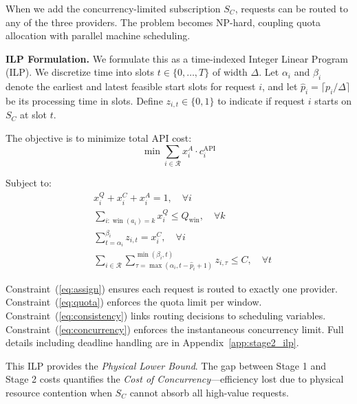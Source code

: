 When we add the concurrency-limited subscription $S_C$, requests can be routed to any of the three providers. The problem becomes NP-hard, coupling quota allocation with parallel machine scheduling.

\textbf{ILP Formulation.}
We formulate this as a time-indexed Integer Linear Program (ILP). We discretize time into slots $t \in \{0, \dots, T\}$ of width $\Delta$. Let $\alpha_i$ and $\beta_i$ denote the earliest and latest feasible start slots for request $i$, and let $\hat{p}_i = \lceil p_i / \Delta \rceil$ be its processing time in slots. Define $z_{i,t} \in \{0,1\}$ to indicate if request $i$ starts on $S_C$ at slot $t$.

The objective is to minimize total API cost:
\begin{equation}
    \min \sum_{i \in \mathcal{R}} x_i^A \cdot c_i^{\text{API}}
\end{equation}

Subject to:
\begin{align}
    & x_i^Q + x_i^C + x_i^A = 1, \quad \forall i \label{eq:assign} \\
    & \sum_{i: \operatorname{win}(a_i)=k} x_i^Q \le Q_{\text{win}}, \quad \forall k \label{eq:quota} \\
    & \sum_{t=\alpha_i}^{\beta_i} z_{i,t} = x_i^C, \quad \forall i \label{eq:consistency} \\
    & \sum_{i \in \mathcal{R}} \sum_{\tau=\max(\alpha_i, t-\hat{p}_i+1)}^{\min(\beta_i, t)} z_{i,\tau} \le C, \quad \forall t \label{eq:concurrency}
\end{align}

Constraint~(\ref{eq:assign}) ensures each request is routed to exactly one provider. Constraint~(\ref{eq:quota}) enforces the quota limit per window. Constraint~(\ref{eq:consistency}) links routing decisions to scheduling variables. Constraint~(\ref{eq:concurrency}) enforces the instantaneous concurrency limit. Full details including deadline handling are in Appendix~\ref{app:stage2_ilp}.

This ILP provides the \textit{Physical Lower Bound}. The gap between Stage 1 and Stage 2 costs quantifies the \textit{Cost of Concurrency}---efficiency lost due to physical resource contention when $S_C$ cannot absorb all high-value requests.
